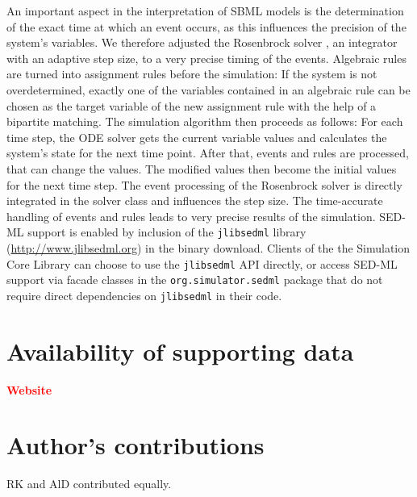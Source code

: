 \documentclass[10pt]{bmc_article}
\newenvironment{bmcformat}{\baselineskip20pt\sloppy\setboolean{publ}{false}}{\baselineskip20pt\sloppy}
\newcommand{\TODO}[1]{\textcolor{red}{\textbf{#1}}}
\newcommand{\jlibsedml}{\texttt{jlibsedml}}
\begin{document}
\begin{bmcformat}
%
An important aspect in the interpretation of SBML models is the
determination of the exact time at which an event occurs, as this influences
the precision of the system's variables. We therefore adjusted the Rosenbrock
solver \cite{Kotcon2011}, an integrator with an adaptive step size, to a very
precise timing of the events.
%
Algebraic rules are turned into assignment rules before the
simulation: If the system is not overdetermined, exactly one of the variables
contained in an algebraic rule can be chosen as the target variable of the
new assignment rule with the help of a bipartite matching.
%
The simulation algorithm then proceeds as follows: For each time step, the ODE
solver gets the current variable values and
calculates the system's state for the next time point. After that, events
and rules are processed, that can change the values. The modified values then
become the initial values for the next time step. The event processing of the
Rosenbrock solver
is directly integrated in the solver class and influences the
step size. The time-accurate handling of events and rules leads to very precise
results of the simulation.
%
SED-ML support is enabled by inclusion of the \jlibsedml{} library
(\href{http://www.jlibsedml.org}{http://www.jlibsedml.org}) in the binary
download. Clients of the the Simulation Core Library can choose to use the
\jlibsedml{} API directly, or access SED-ML support via  facade classes
in the \texttt{org.simulator.sedml} package that do not require direct
dependencies on \jlibsedml{} in their code.


\section{Availability of supporting data}

\TODO{Website}

\bigskip

\section*{Author's contributions}
   RK and AlD contributed equally.


\end{bmcformat}
\end{document}
